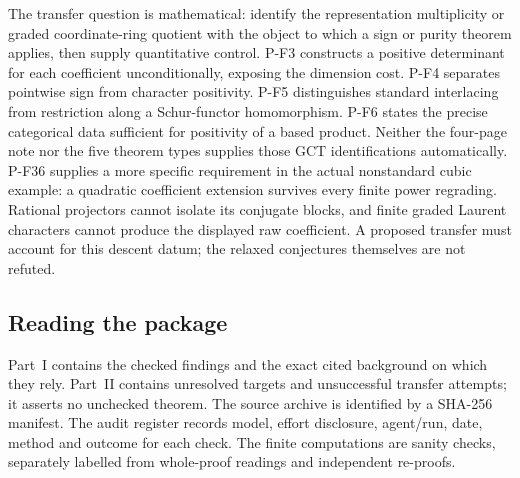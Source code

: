 The transfer question is mathematical: identify the representation
multiplicity or graded coordinate-ring quotient with the object to which
a sign or purity theorem applies, then supply quantitative control.
P-F3 constructs a positive determinant for each coefficient
unconditionally, exposing the dimension cost. P-F4 separates pointwise
sign from character positivity. P-F5 distinguishes standard interlacing
from restriction along a Schur-functor homomorphism. P-F6 states the
precise categorical data sufficient for positivity of a based product.
Neither the four-page note nor the five theorem types supplies those GCT
identifications automatically.
P-F36 supplies a more specific requirement in the actual nonstandard
cubic example: a quadratic coefficient extension survives every
finite power regrading. Rational projectors cannot isolate its
conjugate blocks, and finite graded Laurent characters cannot
produce the displayed raw coefficient. A proposed transfer must
account for this descent datum; the relaxed conjectures themselves
are not refuted.

\subsection*{Reading the package}
Part~I contains the checked findings and the exact cited background on
which they rely. Part~II contains unresolved targets and unsuccessful
transfer attempts; it asserts no unchecked theorem. The source archive
is identified by a SHA-256 manifest. The audit register records model,
effort disclosure, agent/run, date, method and outcome for each check.
The finite computations are sanity checks, separately labelled from
whole-proof readings and independent re-proofs.
